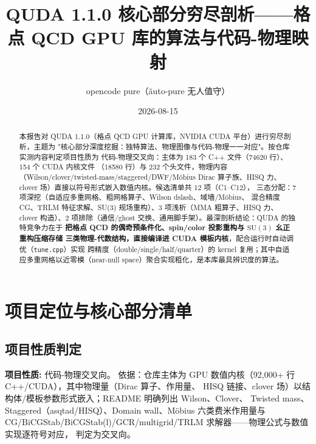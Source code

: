 \documentclass[UTF8]{ctexart}
\title{QUDA 1.1.0 核心部分穷尽剖析——格点 QCD GPU 库的算法与代码-物理映射}
\author{opencode pure（\~auto-pure 无人值守）}
\date{2026-08-15}
\begin{document}
\maketitle

\begin{abstract}
本报告对 QUDA 1.1.0（格点 QCD GPU 计算库，NVIDIA CUDA 平台）进行穷尽剖析，主题为
"核心部分深度挖掘：独特算法、物理图像与代码-物理一一对应"。按仓库实测内容判定项目性质为
\textcolor{phys}{代码-物理交叉向}：主体为 183 个 C++ 文件（74620 行）、154 个 CUDA 内核文件
（18580 行）与 232 个头文件，物理内容（Wilson/clover/twisted-mass/staggered/DWF/Möbius
Dirac 算子族、HISQ 力、clover 场）直接以符号形式嵌入数值内核。候选清单共 12 项（C1--C12），
三态分配：\textcolor{algo}{7 项深挖}（自适应多重网格、粗网格算子、Wilson dslash、域墙/Möbius、
混合精度 CG、TRLM 特征求解、SU(3) 规场重构）、\textcolor{map}{3 项浅析}（MMA 粗算子、HISQ 力、
clover 构造）、2 项排除（通信/ghost 交换、通用脚手架）。最深剖析结论：QUDA 的独特竞争力在于
\textbf{把格点 QCD 的偶奇预条件化、spin/color 投影重构与 $\mathrm{SU}(3)$ 幺正重构压缩存储
三类物理-代数结构，直接编译进 CUDA 模板内核}，配合运行时自动调优（\texttt{tune.cpp}）实现
跨精度（double/single/half/quarter）的 kernel 复用；其中自适应多重网格以近零模（near-null
space）聚合实现粗化，是本库最具辨识度的算法。
\end{abstract}

\tableofcontents

\section{项目定位与核心部分清单}
\subsection{项目性质判定}
\begin{keybox}
\textbf{项目性质:} \textcolor{phys}{代码-物理交叉向}。
依据：仓库主体为 GPU 数值内核（92,000+ 行 C++/CUDA），其中物理量（Dirac 算子、作用量、
HISQ 链接、clover 场）以结构体/模板参数形式嵌入；README 明确列出 Wilson、Clover、
Twisted mass、Staggered（asqtad/HISQ）、Domain wall、Möbius 六类费米作用量与
CG/BiCGStab/BiCGStab(l)/GCR/multigrid/TRLM 求解器——物理公式与数值实现逐符号对应，
判定为交叉向。
\end{keybox}
\end{document}
